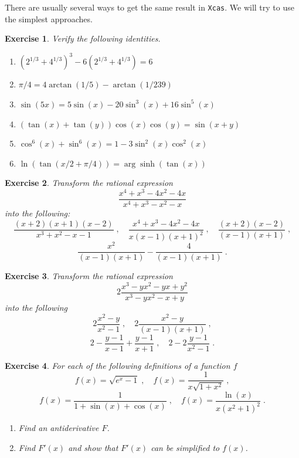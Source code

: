 \documentclass{article}
\newtheorem{exo}{Exercise}[section]
\begin{document}
There are usually several ways to get the same result in
\texttt{Xcas}.  We will try to use the simplest approaches.

\begin{exo}{\rm
Verify the following identities.
\begin{enumerate}
\item
$(2^{1/3}+4^{1/3})^3-6(2^{1/3}+4^{1/3})=6$
\item
$\pi /4 = 4\arctan(1/5)-\arctan(1/239)$
\item
$\sin(5x) = 5\sin(x)-20\sin^3(x)+16\sin^5(x)$
\item
$(\tan(x)+\tan(y))\cos(x)\cos(y) = \sin(x+y)$
\item
  $\cos^6(x)+\sin^6(x) = 1-3\sin^2(x)\cos^2(x)$
\item
$\ln(\tan(x/2+\pi/4)) = \arg\sinh(\tan(x))$
\end{enumerate}
}\end{exo}
\begin{exo}{\rm
Transform the rational expression
\[
\frac{x^4+x^3-4x^2-4x}{x^4+x^3-x^2-x}
\]
into the following:
\[
\frac{(x+2)(x+1)(x-2)}{x^3+x^2-x-1}
\;,\quad
\frac{x^4+x^3-4x^2-4x}{x(x-1)(x+1)^2}
\;,\quad
\frac{(x+2)(x-2)}{(x-1)(x+1)}\;,
\]
\[
\frac{x^2}{(x-1)(x+1)}-\frac{4}{(x-1)(x+1)}\;.
\]
}\end{exo}
\begin{exo}{\rm
Transform the rational expression
\[
2\frac{x^3-yx^2-yx+y^2}{x^3-yx^2-x+y}
\]
into the following
\[
2\frac{x^2-y}{x^2-1}
\;,\quad
2\frac{x^2-y}{(x-1)(x+1)}
\;,
\]
\[
2-\frac{y-1}{x-1}+\frac{y-1}{x+1}
\;,\quad
2-2\frac{y-1}{x^2-1}\;.
\]
}\end{exo}
\begin{exo}{\rm
For each of the following definitions of a function $f$
\[
f(x) = \sqrt{e^x-1}
\;,\quad
f(x) = \frac{1}{x\sqrt{1+x^2}}
\;,
\]
\[
f(x) = \frac{1}{1+\sin(x)+\cos(x)}
\;,\quad
f(x) = \frac{\ln(x)}{x(x^2+1)^2}
 \;.
\]
\begin{enumerate}
\item
Find an antiderivative $F$.
\item
Find $F'(x)$ and show that $F'(x)$ can be simplified to $f(x)$.
\end{enumerate}
}\end{exo}
\end{document}
